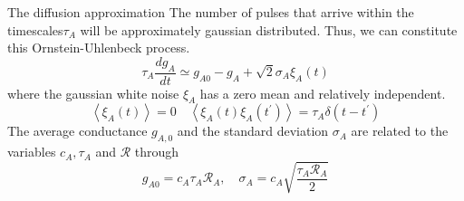 \documentclass{beamer}
\begin{document}
\begin{frame}{The diffusion approximation}
	The number of pulses that arrive within the timescales$ \tau_{A} $ will be approximately gaussian distributed. Thus, we can constitute this Ornstein-Uhlenbeck process.
		\begin{equation}
		\tau_{A} \frac{d g_{A}}{d t} \simeq g_{A 0}-g_{A}+\sqrt{2} \sigma_{A} \xi_{A}(t)
	\end{equation}
	where the gaussian white noise $ \xi_{A} $ has a zero mean and relatively independent.
	\begin{equation}
		\left\langle\xi_{A}(t)\right\rangle=0 \quad\left\langle\xi_{A}(t) \xi_{A}\left(t^{\prime}\right)\right\rangle=\tau_{A} \delta\left(t-t^{\prime}\right)
	\end{equation}
	The average conductance $ g_{A, 0} $ and the standard deviation $ \sigma_{A} $ are related to the variables $ c_{A}, \tau_{A} $ and $ \mathcal{R} $ through
	\begin{equation}
		g_{A 0}=c_{A} \tau_{A} \mathcal{R}_{A}, \quad \sigma_{A}=c_{A}  \sqrt{\frac{\tau_{A}\mathcal{R}_{A}}{2}}
	\end{equation}
\end{frame}
\end{document}
